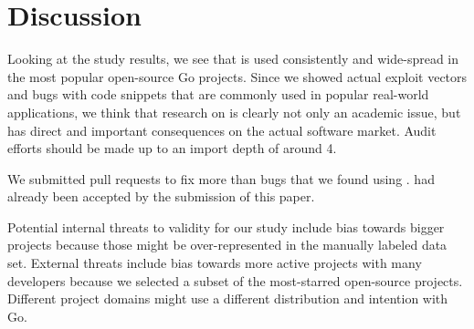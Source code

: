 \section{Discussion}
\label{sec:discussion}

Looking at the study results, we see that \unsafe{} is used consistently and wide-spread in the most popular open-source Go projects.
Since we showed actual exploit vectors and bugs with code snippets that are commonly used in popular real-world applications, we think that research on \unsafe{} is clearly not only an academic issue, but has direct and important consequences on the actual software market.
Audit efforts should be made up to an import depth of around 4.

We submitted \numberPRs{} pull requests to fix more than \numberBugsFixed{} bugs that we found using \toolSA{}.
\numberPRsMerged{} had already been accepted by the submission of this paper.

Potential internal threats to validity for our study include bias towards bigger projects because those might be over-represented in the manually labeled data set. External threats include bias towards more active projects with many developers because we selected a subset of the most-starred open-source projects. Different project domains might use a different distribution and intention with \unsafe{} Go.


